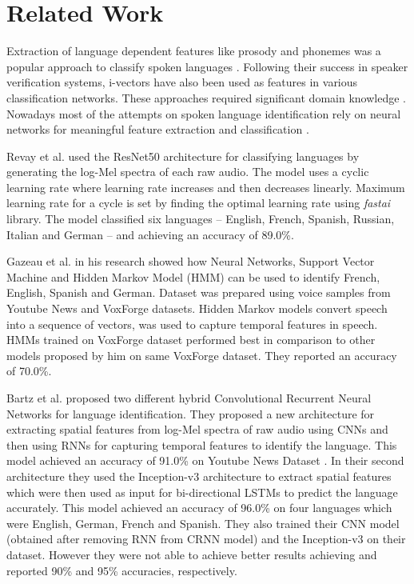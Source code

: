 \documentclass[runningheads]{llncs}
\begin{document}
\section{Related Work}

Extraction of language dependent features like prosody and phonemes was a popular approach to classify spoken languages \cite{zissman1996comparison,martinez2011language,ferrer2010comparison}. Following their success in speaker verification systems, i-vectors have also been used as features in various classification networks. These approaches required significant domain knowledge \cite{dehak2011language,martinez2011language}. Nowadays most of the attempts on spoken language identification rely on neural networks for meaningful feature extraction and classification \cite{lopez2014automatic,ganapathy2014robust}.


Revay et al. \cite{revay2019multiclass} used the ResNet50 \cite{DBLP:conf/cvpr/HeZRS16} architecture for classifying languages by generating the log-Mel spectra of each raw audio. The model uses a cyclic learning rate where learning rate increases and then decreases linearly. Maximum learning rate for a cycle is set by finding the optimal learning rate using \emph{fastai} \cite{FastAI} library. The model classified six languages -- English, French, Spanish, Russian, Italian and German -- and achieving an accuracy of 89.0\%.

Gazeau et al. \cite{gazeau2018automatic} in his research showed how Neural Networks, Support Vector Machine and Hidden Markov Model (HMM) can be used to identify French, English, Spanish and German. Dataset was prepared using voice samples from Youtube News \cite{Youtube}and VoxForge \cite{VoxForge.org} datasets. Hidden Markov models convert speech into a sequence of vectors, was used to capture temporal features in speech. HMMs trained on VoxForge \cite{VoxForge.org} dataset performed best in comparison to other models proposed by him on same VoxForge dataset. They reported an accuracy of 70.0\%.

Bartz et al. \cite{bartz2017language} proposed two different hybrid Convolutional Recurrent Neural Networks for language identification. They proposed a new architecture for extracting spatial features from log-Mel spectra of raw audio using CNNs and then using RNNs for capturing temporal features to identify the language. This model achieved an accuracy of 91.0\% on Youtube News Dataset \cite{Youtube}. In their second architecture they used the Inception-v3 \cite{szegedy2016rethinking} architecture to extract spatial features which were then used as input for bi-directional LSTMs to predict the language accurately. This model achieved an accuracy of 96.0\% on four languages which were English, German, French and Spanish. They also trained their CNN model (obtained after removing RNN from CRNN model) and the Inception-v3 on their dataset. However they were not able to achieve better results achieving and reported 90\% and 95\% accuracies, respectively. 
\end{document}

